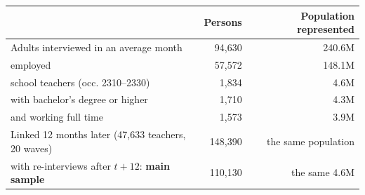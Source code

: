 \begin{tabular}{lrr}
\toprule
 & Persons & Population represented \\
\midrule
Adults interviewed in an average month & 94,630 & 240.6M \\
\quad employed & 57,572 & 148.1M \\
\quad\quad school teachers (occ. 2310--2330) & 1,834 & 4.6M \\
\quad\quad\quad with bachelor's degree or higher & 1,710 & 4.3M \\
\quad\quad\quad\quad and working full time & 1,573 & 3.9M \\
Linked 12 months later (47,633 teachers, 20 waves) & 148,390 & the same population \\
\quad with re-interviews after $t{+}12$: \textbf{main sample} & 110,130 & the same 4.6M \\
\bottomrule
\end{tabular}
